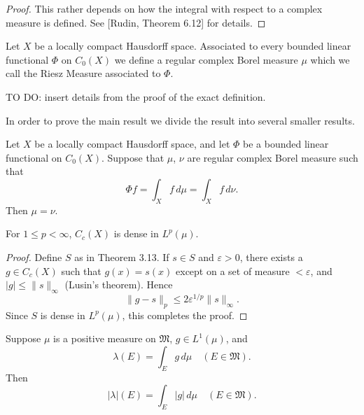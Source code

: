 \begin{proof}
  This rather depends on how the integral with respect to a complex measure is defined.
  See [Rudin, Theorem 6.12] for details.
\end{proof}


\begin{definition}
  \label{def:riesz_measure}
  \notready
  Let $X$ be a locally compact Hausdorff space.
  Associated to every bounded linear functional $\Phi$ on $C_0(X)$ we define a regular complex Borel measure $\mu$ which we call the Riesz Measure associated to $\Phi$.

  TO DO: insert details from the proof of the exact definition.
\end{definition}

In order to prove the main result we divide the result into several smaller results.

\begin{lemma}
  \label{lem:rieszMeasure_unique}
  Let $X$ be a locally compact Hausdorff space, and let $\Phi$ be a bounded linear functional on $C_0(X)$.
  Suppose that $\mu$, $\nu$ are regular complex Borel measure such that
  \begin{equation*}
    \Phi f = \int_X f \, d\mu = \int_X f \, d\nu.
  \end{equation*}
  Then \(\mu = \nu\).
\end{lemma}

\begin{theorem}[Rudin 3.14]
  \label{thm:Cc_dense_Lp}
  For $1 \leq p < \infty$, $C_c(X)$ is dense in $L^p(\mu)$.
\end{theorem}

\begin{proof}
  Define $S$ as in Theorem 3.13. If $s \in S$ and $\varepsilon > 0$, there exists a $g \in C_c(X)$ such that $g(x) = s(x)$ except on a set of measure $< \varepsilon$, and $|g| \leq \|s\|_\infty$ (Lusin's theorem).
  Hence
  \begin{equation}
    \|g - s\|_p \leq 2\varepsilon^{1/p}\|s\|_\infty.
  \end{equation}
  Since $S$ is dense in $L^p(\mu)$, this completes the proof.
\end{proof}

\begin{theorem}[Rudin 6.13]
  \label{thm:abs_integral}
  Suppose $\mu$ is a positive measure on $\mathfrak{M}$, $g \in L^1(\mu)$, and
  \begin{equation}
    \lambda(E) = \int_E g \, d\mu \quad (E \in \mathfrak{M}).
  \end{equation}
  Then
  \begin{equation}
    |\lambda|(E) = \int_E |g| \, d\mu \quad (E \in \mathfrak{M}).
  \end{equation}
\end{theorem}

